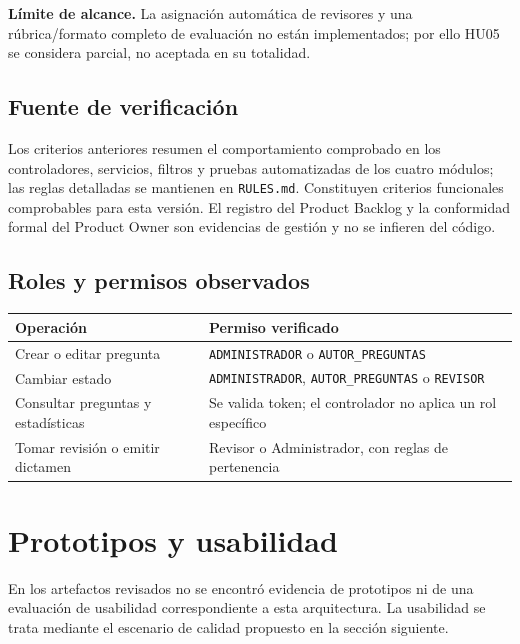 \documentclass[12pt,a4paper]{article}
\begin{document}
\textbf{Límite de alcance.} La asignación automática de revisores y una rúbrica/formato completo de evaluación no están implementados; por ello HU05 se considera parcial, no aceptada en su totalidad.

\subsection{Fuente de verificación}
Los criterios anteriores resumen el comportamiento comprobado en los controladores, servicios, filtros y pruebas automatizadas de los cuatro módulos; las reglas detalladas se mantienen en \texttt{RULES.md}. Constituyen criterios funcionales comprobables para esta versión. El registro del Product Backlog y la conformidad formal del Product Owner son evidencias de gestión y no se infieren del código.

\subsection{Roles y permisos observados}
\begin{tabularx}{\textwidth}{p{3.5cm}X}
\toprule Operación & Permiso verificado \\
\midrule
Crear o editar pregunta & \texttt{ADMINISTRADOR} o \texttt{AUTOR\_PREGUNTAS} \\
Cambiar estado & \texttt{ADMINISTRADOR}, \texttt{AUTOR\_PREGUNTAS} o \texttt{REVISOR} \\
Consultar preguntas y estadísticas & Se valida token; el controlador no aplica un rol específico \\
Tomar revisión o emitir dictamen & Revisor o Administrador, con reglas de pertenencia \\
\bottomrule
\end{tabularx}

\section{Prototipos y usabilidad}
En los artefactos revisados no se encontró evidencia de prototipos ni de una evaluación de usabilidad correspondiente a esta arquitectura. La usabilidad se trata mediante el escenario de calidad propuesto en la sección siguiente.
\end{document}
